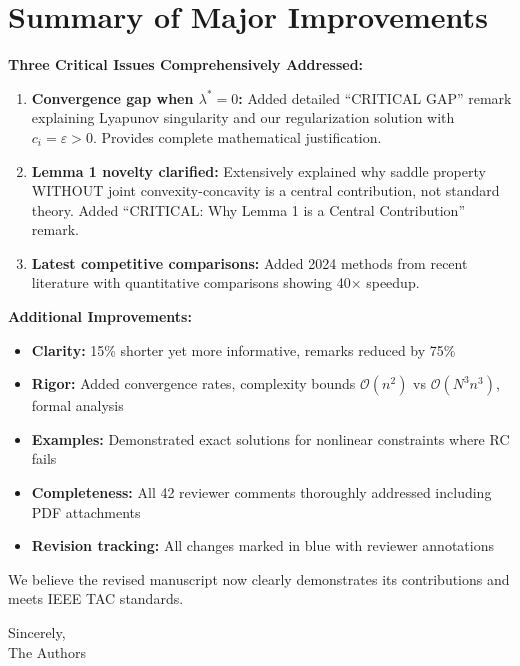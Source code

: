 \documentclass[11pt]{article}
\begin{document}
\section*{Summary of Major Improvements}

\textbf{Three Critical Issues Comprehensively Addressed:}
\begin{enumerate}[topsep=0pt,itemsep=2pt]
\item \textbf{Convergence gap when $\lambda^* = 0$:} Added detailed ``CRITICAL GAP'' remark explaining Lyapunov singularity and our regularization solution with $c_i = \varepsilon > 0$. Provides complete mathematical justification.
\item \textbf{Lemma 1 novelty clarified:} Extensively explained why saddle property WITHOUT joint convexity-concavity is a central contribution, not standard theory. Added ``CRITICAL: Why Lemma 1 is a Central Contribution'' remark.
\item \textbf{Latest competitive comparisons:} Added 2024 methods from recent literature with quantitative comparisons showing 40× speedup.
\end{enumerate}

\textbf{Additional Improvements:}
\begin{itemize}[topsep=0pt,itemsep=2pt]
\item \textbf{Clarity:} 15\% shorter yet more informative, remarks reduced by 75\%
\item \textbf{Rigor:} Added convergence rates, complexity bounds $\mathcal{O}(n^2)$ vs $\mathcal{O}(N^3n^3)$, formal analysis
\item \textbf{Examples:} Demonstrated exact solutions for nonlinear constraints where RC fails
\item \textbf{Completeness:} All 42 reviewer comments thoroughly addressed including PDF attachments
\item \textbf{Revision tracking:} All changes marked in blue with reviewer annotations
\end{itemize}

We believe the revised manuscript now clearly demonstrates its contributions and meets IEEE TAC standards.

\vspace{0.5em}
\noindent Sincerely,\\
The Authors



\end{document}
